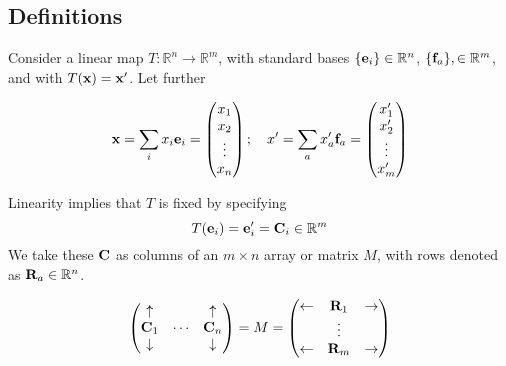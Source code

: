 \subsection{Definitions}
Consider a linear map $T: \mathbb R^n \to \mathbb R^m$, with standard bases $\{ \vb e_i \} \in \mathbb R^n$, $\{ \vb f_a \}, \in \mathbb R^m$, and with $T(\vb x) = \vb x'$.
Let further

\[ \vb x = \sum_i x_i \vb e_i = \begin{pmatrix}
		x_1 \\ x_2 \\ \vdots \\ x_n
	\end{pmatrix};\quad x' = \sum_a x_a' \vb f_a = \begin{pmatrix}
		x_1' \\ x_2' \\ \vdots \\ x_m'
	\end{pmatrix} \]

Linearity implies that $T$ is fixed by specifying
\[ T(\vb e_i) = \vb e_i' = \vb C_i \in \mathbb R^m \]
We take these $\vb C$ as columns of an $m \times n$ array or matrix $M$, with rows denoted as $\vb R_a \in \mathbb R^n$.

\[ \begin{pmatrix}
		\uparrow   &        & \uparrow   \\
		\vb C_1    & \cdots & \vb C_n    \\
		\downarrow &        & \downarrow
	\end{pmatrix} = M = \begin{pmatrix}
		\leftarrow & \vb R_1 & \rightarrow \\
		           & \vdots  &             \\
		\leftarrow & \vb R_m & \rightarrow
	\end{pmatrix} \]

